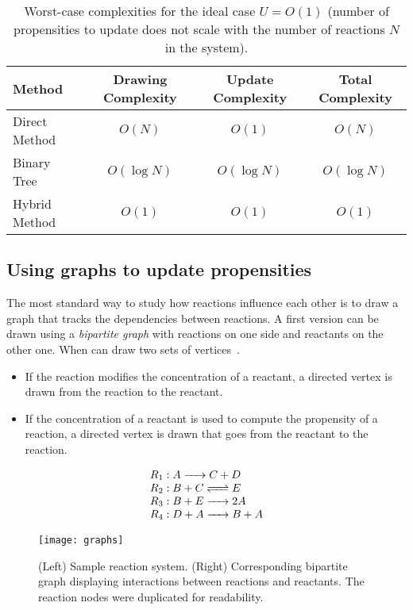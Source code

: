 \begin{table}[!h]
  \centering
  \begin{tabular}{|l|c|c|c|}
    \hline
    Method & Drawing Complexity & Update Complexity & Total Complexity\\
    \hline
    Direct Method & $O(N)$ & $O(1)$ & $O(N)$\\
    Binary Tree & $O(\log N)$ & $O(\log N)$ & $O(\log N)$\\
    Hybrid Method & $O(1)$ & $O(1)$ & $O(1)$\\
    \hline
  \end{tabular}
  \caption{Worst-case complexities for the ideal case $U=O(1)$ (number of propensities to update does not scale with the number of reactions $N$ in the system).}
  \label{tab:ideal_update}
\end{table}	

\subsection{Using graphs to update propensities}

The most standard way to study how reactions influence each other is to draw a graph that tracks the dependencies between reactions. A first version can be drawn using a \emph{bipartite graph} with reactions on one side and reactants on the other one. When can draw two sets of vertices~.
\begin{itemize}
  \item If the reaction modifies the concentration of a reactant, a directed vertex is drawn from the reaction to the reactant.
  \item If the concentration of a reactant is used to compute the propensity of a reaction, a directed vertex is drawn that goes from the reactant to the reaction.
\end{itemize}

\begin{figure}[!h]
  \centering
  \begin{minipage}{0.39\textwidth}
    \[
    \begin{array}{l}
      R_1:\reactionIrr{A}{C+D}{}{} \\
      R_2:\reactionRev{B+C}{E}{}{} \\
      R_3:\reactionIrr{B+E}{2A}{}{} \\
      R_4:\reactionIrr{D+A}{B+A}{}{}
    \end{array}
    \]
  \end{minipage}
  \begin{minipage}{0.59\textwidth}
    \texttt{[image: graphs]}
  \end{minipage}
  \caption{(Left) Sample reaction system. (Right) Corresponding bipartite graph displaying interactions between reactions and reactants. The reaction nodes were duplicated for readability.}
  \label{fig:reactant_reaction_graph}
\end{figure}

